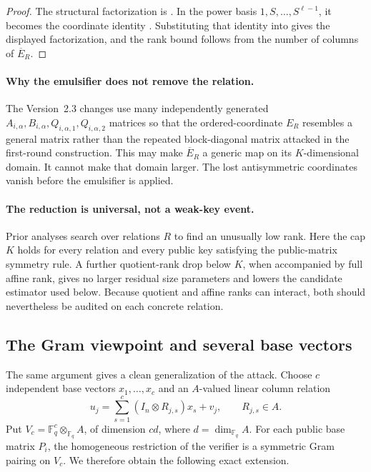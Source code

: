 \documentclass[11pt]{article}
\newcommand{\F}{\mathbb F}
\begin{document}
\begin{proof}
The structural factorization is .  In the power
basis $1,S,\ldots,S^{\ell-1}$, it becomes the coordinate identity
.  Substituting that identity into 
gives the displayed factorization, and the rank bound follows from the number
of columns of $\overline E_R$.
\end{proof}

\paragraph{Why the emulsifier does not remove the relation.}
The Version~2.3 changes use many independently generated $A_{i,\alpha},B_{i,\alpha},Q_{i,\alpha,1},Q_{i,\alpha,2}$ matrices so that the ordered-coordinate $E_R$ resembles a general matrix rather than the repeated block-diagonal matrix attacked in the first-round construction.  This may make $\overline E_R$ a generic map on its $K$-dimensional domain.  It cannot make that domain larger.  The lost antisymmetric coordinates vanish before the emulsifier is applied.

\paragraph{The reduction is universal, not a weak-key event.}
Prior analyses search over relations $R$ to find an unusually low rank.  Here the cap $K$ holds for every relation and every public key satisfying the public-matrix symmetry rule.  A further quotient-rank drop below $K$, when accompanied by full affine rank, gives no larger residual size parameters and lowers the candidate estimator used below.  Because quotient and affine ranks can interact, both should nevertheless be audited on each concrete relation.

\subsection{The Gram viewpoint and several base vectors}\label{sec:gram}

The same argument gives a clean generalization of the attack.  Choose
$c$ independent base vectors $x_1,\ldots,x_c$ and an $A$-valued linear
column relation
\begin{equation}\label{eq:cbase}
 u_j=\sum_{s=1}^{c}(I_n\otimes R_{j,s})x_s+v_j,
 \qquad R_{j,s}\in A.
\end{equation}
Put $V_c=\F_q^c\otimes_{\F_q}A$, of dimension $cd$, where
$d=\dim_{\F_q}A$.  For each public base matrix $P_i$, the homogeneous
restriction of the verifier is a symmetric Gram pairing on $V_c$.  We therefore
obtain the following exact extension.
\end{document}
